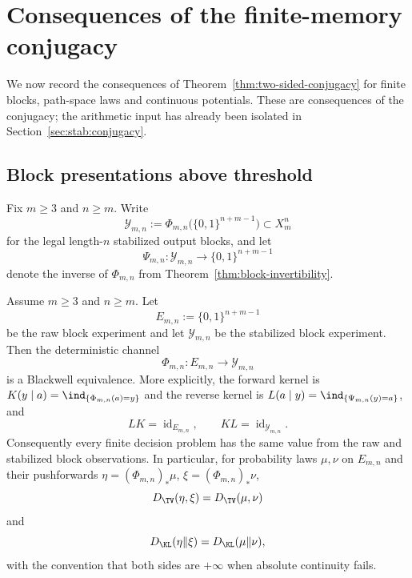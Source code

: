 \section{Consequences of the finite-memory conjugacy}\label{sec:measurement}

We now record the consequences of Theorem~\ref{thm:two-sided-conjugacy} for
finite blocks, path-space laws and continuous potentials. These are consequences
of the conjugacy; the arithmetic input has already been isolated in
Section~\ref{sec:stab:conjugacy}.

\subsection{Block presentations above threshold}\label{sec:measurement:sufficiency}

Fix $m\ge 3$ and $n\ge m$.  Write
\[
\mathcal Y_{m,n}:=\Phi_{m,n}\bigl(\{0,1\}^{n+m-1}\bigr)\subset X_m^n
\]
for the legal length-$n$ stabilized output blocks, and let
\[
\Psi_{m,n}:\mathcal Y_{m,n}\to\{0,1\}^{n+m-1}
\]
denote the inverse of $\Phi_{m,n}$ from Theorem~\ref{thm:block-invertibility}.

\begin{theorem}\label{thm:exact-sufficiency}
Assume $m\ge3$ and $n\ge m$.  Let
\[
E_{m,n}:=\{0,1\}^{n+m-1}
\]
be the raw block experiment and let $\mathcal Y_{m,n}$ be the stabilized
block experiment.  Then the deterministic channel
\[
\Phi_{m,n}:E_{m,n}\to\mathcal Y_{m,n}
\]
is a Blackwell equivalence.  More explicitly, the forward kernel is
$K(y\mid a)=\ind_{\{\Phi_{m,n}(a)=y\}}$ and the reverse kernel is
$L(a\mid y)=\ind_{\{\Psi_{m,n}(y)=a\}}$, and
\[
LK=\operatorname{id}_{E_{m,n}},\qquad KL=\operatorname{id}_{\mathcal Y_{m,n}}.
\]
Consequently every finite decision problem has the same value from the raw and
stabilized block observations.  In particular, for probability laws $\mu,\nu$
on $E_{m,n}$ and their pushforwards
$\eta=(\Phi_{m,n})_*\mu$, $\xi=(\Phi_{m,n})_*\nu$,
\[
D_{\TV}(\eta,\xi)=D_{\TV}(\mu,\nu)
\]
and
\[
D_{\KL}(\eta\|\xi)=D_{\KL}(\mu\|\nu),
\]
with the convention that both sides are $+\infty$ when absolute continuity
fails.
\end{theorem}

